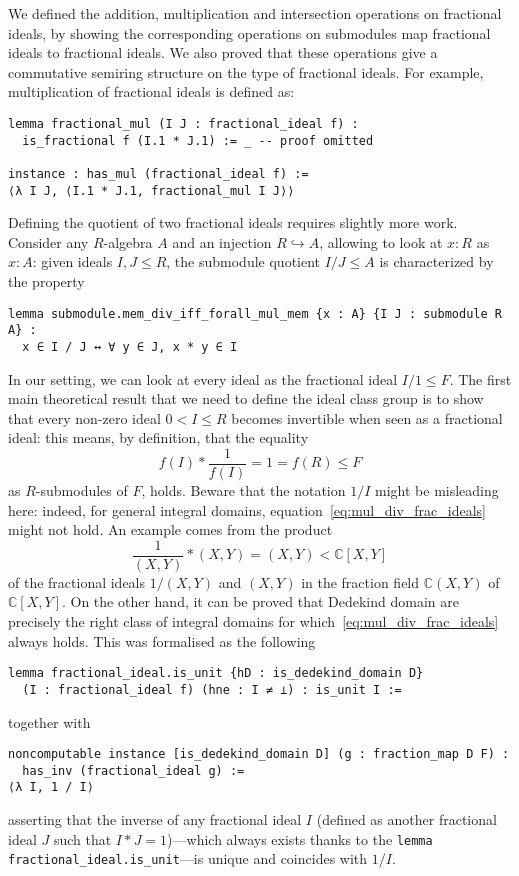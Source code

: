 \documentclass[a4paper,USenglish,cleveref, autoref, thm-restate]{lipics-v2021}
\newcommand{\C}{\mathbb{C}}
\newcommand{\lean}[1]{\texttt{#1}\xspace} %
\newcommand{\mathlib}{\textsf{mathlib}\xspace}
\begin{document}
We defined the addition, multiplication and intersection operations on fractional ideals,
by showing the corresponding operations on submodules map fractional ideals to fractional ideals.
We also proved that these operations give a commutative semiring structure on the type of fractional ideals.
For example, multiplication of fractional ideals is defined as:
\begin{lstlisting}
lemma fractional_mul (I J : fractional_ideal f) :
  is_fractional f (I.1 * J.1) := _ -- proof omitted

instance : has_mul (fractional_ideal f) :=
⟨λ I J, ⟨I.1 * J.1, fractional_mul I J⟩⟩
\end{lstlisting}

Defining the quotient of two fractional ideals requires slightly more work. Consider any $R$-algebra $A$ and an injection $R\hookrightarrow A$, allowing to look at $x:R$ as $x:A$: given ideals $I,J\le R$, the submodule quotient $I / J\le A$ %
is characterized by the property
\begin{lstlisting}
lemma submodule.mem_div_iff_forall_mul_mem {x : A} {I J : submodule R A} :
  x ∈ I / J ↔ ∀ y ∈ J, x * y ∈ I
\end{lstlisting}
In our setting, %
we can look at every ideal as the fractional ideal $I/1 \le F$. The first main theoretical result that we need to define the ideal class group is to show that every non-zero ideal $0<I \le R$ becomes invertible when seen as a fractional ideal: this means, by definition, that the equality 
\begin{equation}\label{eq:mul_div_frac_ideals}
f(I) \ast \frac{1}{f(I)} = 1=f(R)\le F
\end{equation}
as $R$-submodules of $F$, holds. Beware that the notation $1/I$ might be misleading here: indeed, for general integral domains, equation~\eqref{eq:mul_div_frac_ideals} might not hold. An example comes from the product
\[
\frac{1}{(X,Y)}\ast (X,Y)=(X,Y)<\C[X,Y]
\]
of the fractional ideals $1/(X,Y)$ and $(X,Y)$ in the fraction field $\C(X,Y)$ of $\C[X,Y]$. On the other hand, it can be proved that Dedekind domain are precisely the right class of integral domains for which~\eqref{eq:mul_div_frac_ideals} always holds. This was formalised as the following
\begin{lstlisting}
lemma fractional_ideal.is_unit {hD : is_dedekind_domain D}
  (I : fractional_ideal f) (hne : I ≠ ⊥) : is_unit I :=
\end{lstlisting}
together with
\begin{lstlisting}
noncomputable instance [is_dedekind_domain D] (g : fraction_map D F) :
  has_inv (fractional_ideal g) :=
⟨λ I, 1 / I⟩
\end{lstlisting}
asserting that the inverse of any fractional ideal $I$ (defined as another fractional ideal $J$ such that $I\ast J=1$)---which always exists thanks to the \lean{lemma fractional\_ideal.is\_unit}---is unique and coincides with $1/I$.
\end{document}
